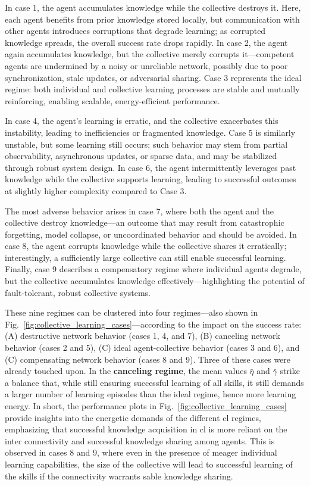 \documentclass[12pt]{article}
\begin{document}
In case 1, the agent accumulates knowledge while the collective destroys it. Here, each agent benefits from prior knowledge stored locally, but communication with other agents introduces corruptions that degrade learning; as corrupted knowledge spreads, the overall success rate drops rapidly. In case 2, the agent again accumulates knowledge, but the collective merely corrupts it—competent agents are undermined by a noisy or unreliable network, possibly due to poor synchronization, stale updates, or adversarial sharing. Case 3  represents the ideal regime: both individual and collective learning processes are stable and mutually reinforcing, enabling scalable, energy-efficient performance.

In case 4, the agent’s learning is erratic, and the collective exacerbates this instability, leading to inefficiencies or fragmented knowledge. Case 5 is similarly unstable, but some learning still occurs; such behavior may stem from partial observability, asynchronous updates, or sparse data, and may be stabilized through robust system design. In case 6, the agent intermittently leverages past knowledge while the collective supports learning, leading to successful outcomes at slightly higher complexity compared to Case 3.

The most adverse behavior arises in case 7, where both the agent and the collective destroy knowledge---an outcome that may result from catastrophic forgetting, model collapse, or uncoordinated behavior and should be avoided. In case 8, the agent corrupts knowledge while the collective shares it erratically; interestingly, a sufficiently large collective can still enable successful learning. Finally, case 9 describes a compensatory regime where individual agents degrade, but the collective accumulates knowledge effectively---highlighting the potential of fault-tolerant, robust collective systems.

These nine regimes can be clustered into four regimes---also shown in Fig.~\ref{fig:collective_learning_cases}---according to the impact on the success rate:
(A) destructive network behavior (cases 1, 4, and 7), (B) canceling network behavior (cases 2 and 5), (C) ideal agent-collective behavior (cases 3 and 6), and (C) compensating network behavior (cases 8 and 9). Three of these cases were already touched upon. In the \textbf{canceling regime}, the mean values $\bar{\eta}$ and $\bar{\gamma}$ strike a balance that, while still ensuring successful learning of all skills, it still demands a larger number of learning episodes than the ideal regime, hence more learning energy. In short, the performance plots in Fig.~\ref{fig:collective_learning_cases} provide insights into the energetic demands of the different \ac{cl} regimes, emphasizing that successful knowledge acquisition in \acl{cl} is more reliant on the inter connectivity and successful knowledge sharing among agents. This is observed in cases 8 and 9, where even in the presence of meager individual learning capabilities, the size of the collective will lead to successful learning of the skills if the connectivity warrants sable knowledge sharing.
\end{document}
